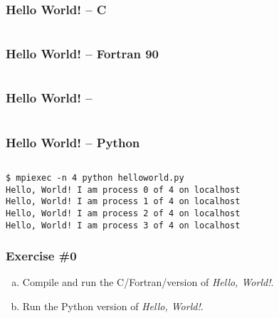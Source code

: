 \begin{frame}[fragile]
  \frametitle{Hello World! -- C}
  \inputminted[linenos]{c}{helloworld.c}
\end{frame}

\begin{frame}[fragile]
  \frametitle{Hello World! -- Fortran 90}
  \inputminted[linenos]{fortran}{helloworld.f90}
\end{frame}

\begin{frame}[fragile]
  \frametitle{Hello World! -- \Cpp}
  \inputminted[linenos]{cpp}{helloworld.cxx}
\end{frame}

\begin{frame}[fragile]
  \frametitle{Hello World! -- Python}
  \inputminted[linenos]{python}{helloworld.py}
  \begin{block}{}
\begin{verbatim}
$ mpiexec -n 4 python helloworld.py
Hello, World! I am process 0 of 4 on localhost
Hello, World! I am process 1 of 4 on localhost
Hello, World! I am process 2 of 4 on localhost
Hello, World! I am process 3 of 4 on localhost
\end{verbatim}
  \end{block}
\end{frame}

\begin{frame}
  \frametitle{Exercise \#0}
  \begin{enumerate}[a)]
  \item Compile and run the C/Fortran/\Cpp version of \emph{Hello, World!}.
  \item Run the Python version of \emph{Hello, World!}.
  \end{enumerate}
\end{frame}
